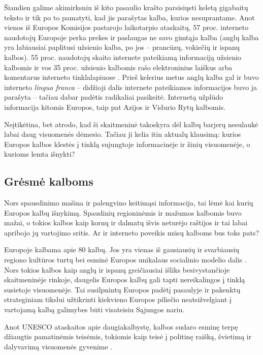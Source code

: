 \documentclass[]{../metanetpaper}
\begin{document}
\begin{multicols}{2}
Šiandien galime akimirksniu iš kito pasaulio krašto parsisiųsti keletą gigabaitų teksto ir tik po to pamatyti, kad jis parašytas kalba, kurios nesuprantame. Anot vienos iš Europos Komisijos pastarojo laikotarpio ataskaitų, 57 proc. interneto naudotojų Europoje perka prekes ir paslaugas ne savo gimtąja kalba (anglų kalba yra labiausiai paplitusi užsienio kalba, po jos – prancūzų, vokiečių ir ispanų kalbos). 55 proc. naudotojų skaito internete pateikiamą informaciją užsienio kalbomis ir vos 35 proc. užsienio kalbomis rašo elektroninius laiškus arba komentarus interneto tinklalapiuose \cite{EC1}.  Prieš kelerius metus anglų kalba gal ir buvo interneto \textit{lingua franca}  – didžioji dalis internete pateikiamos informacijos buvo ja parašyta – tačiau dabar padėtis radikaliai pasikeitė. Internetą užplūdo informacija kitomis Europos, taip pat Azijos ir Vidurio Rytų kalbomis. 

Neįtikėtina, bet atrodo, kad ši skaitmeninė takoskyra dėl kalbų barjerų nesulaukė labai daug visuomenės dėmesio. Tačiau ji kelia itin aktualų klausimą: kurios Europos kalbos klestės į tinklą sujungtoje informacinėje ir žinių visuomenėje, o kurioms lemta išnykti?

\subsection{Grėsmė kalboms }

Nors spausdinimo mašina ir palengvino keitimąsi informacija, tai lėmė kai kurių Europos kalbų išnykimą. Spaudinių regioninėmis ir mažumos kalbomis buvo mažai, o tokios kalbos kaip kornų ir dalmatų išvis neturėjo raštijos ir tai labai apribojo  jų vartojimo sritis. Ar ir interneto poveikis mūsų kalboms bus toks pats?

Europoje kalbama apie 80 kalbų. Jos yra vienas iš gausiausių ir svarbiausių  regiono kultūros turtų bei esminė Europos unikalaus socialinio modelio dalis \cite{EC2}.  Nors tokios kalbos kaip anglų ir ispanų greičiausiai išliks besivystančioje skaitmeninėje rinkoje, daugelis Europos kalbų gali tapti nereikalingos į tinklą susietoje visuomenėje. Tai susilpnintų Europos padėtį pasaulyje ir pakenktų strateginiam tikslui užtikrinti kiekvieno Europos piliečio neatsižvelgiant į vartojamą kalbą galimybes būti visateisiu Sąjungos nariu.  


Anot UNESCO ataskaitos apie daugiakalbystę, kalbos sudaro esminę terpę džiaugtis pamatinėmis teisėmis, tokiomis kaip teisė į politinę raišką, švietimą ir dalyvavimą visuomenės gyvenime \cite{Unesco1}.


\end{multicols}
\end{document}
